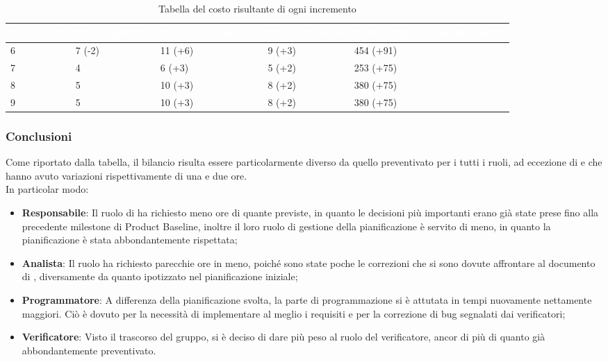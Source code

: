 {
\renewcommand{\arraystretch}{1.65}
\centering
\begin{longtable}{ C{2.1cm} C{2.7cm} C{3cm} C{3cm} C{3.3cm} }
\caption{Tabella del costo risultante di ogni incremento}\\
\textcolor{white}{\textbf{Incremento}} & 
\textcolor{white}{\textbf{Ore progettista}} &
\textcolor{white}{\textbf{Ore programmatore}}&
\textcolor{white}{\textbf{Ore verificatore}}&
\textcolor{white}{\textbf{Costo totale incremento (in \euro{})}}\\
\endhead

6 & 7 (-2) & 11 (+6) & 9 (+3) & 454 (+91) \\
7 & 4      &  6 (+3) & 5 (+2) & 253 (+75) \\
8 & 5      & 10 (+3) & 8 (+2) & 380 (+75) \\
9 & 5      & 10 (+3) & 8 (+2) & 380 (+75) \\

\end{longtable}
}

\subsubsection{Conclusioni}
Come riportato dalla tabella, il bilancio risulta essere particolarmente diverso da quello preventivato per i tutti i ruoli, ad eccezione di  e  che hanno avuto variazioni rispettivamente di una e due ore. \\
In particolar modo:
\begin{itemize}
	\item \textbf{Responsabile}: Il ruolo di \Responsabile{} ha richiesto meno ore di quante previste, in quanto le decisioni più importanti erano già state prese fino alla precedente milestone di Product Baseline, inoltre il loro ruolo di gestione della pianificazione è servito di meno, in quanto la pianificazione è stata abbondantemente rispettata;
	\item \textbf{Analista}: Il ruolo ha richiesto parecchie ore in meno, poiché sono state poche le correzioni che si sono dovute affrontare al documento di \AdR{}, diversamente da quanto ipotizzato nel pianificazione iniziale;
	\item \textbf{Programmatore}: A differenza della pianificazione svolta, la parte di programmazione si è attutata in tempi nuovamente nettamente maggiori. Ciò è dovuto per la necessità di implementare al meglio i requisiti e per la correzione di bug segnalati dai verificatori;
	\item \textbf{Verificatore}: Visto il trascorso del gruppo, si è deciso di dare più peso al ruolo del verificatore, ancor di più di quanto già abbondantemente preventivato.
\end{itemize}
